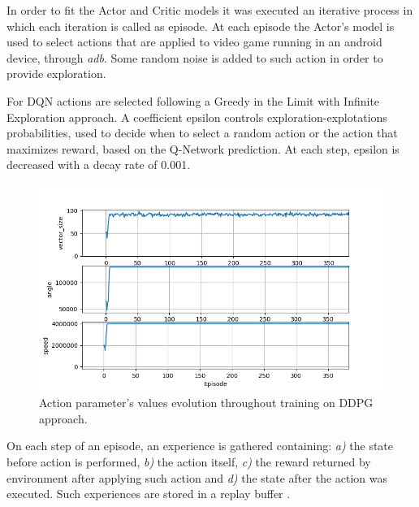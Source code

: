 \documentclass[peerreview,onecolumn]{IEEEtran}
\begin{document}
	
	 In order to fit the Actor and Critic models it was executed an iterative process in which each iteration is called as episode. At each episode the Actor's model is used to select actions that are applied to video game running in an android device, through \textit{adb}. Some random noise is added to such action in order to provide exploration.
	 
	 For DQN actions are selected following a Greedy in the Limit with Infinite Exploration approach. A coefficient epsilon controls exploration-explotations probabilities, used to decide when to select a random action or the action that maximizes reward, based on the Q-Network prediction. At each step, epsilon is decreased with a decay rate of 0.001.
	 
	 \begin{figure}[!h]
		\centering
		\includegraphics[width=0.9\columnwidth]{img/action.png} 
		\caption{Action parameter's values evolution throughout training on DDPG approach.}
		\label{fig:actiosDDPG}
	\end{figure}
	 
	 On each step of an episode, an experience is gathered containing: \textit{a)} the state before action is performed, \textit{b)} the action itself, \textit{c)} the reward returned by environment after applying such action and \textit{d)} the state after the action was executed. Such experiences are stored in a replay buffer \cite{rep_buffer}.
	 
\end{document}
